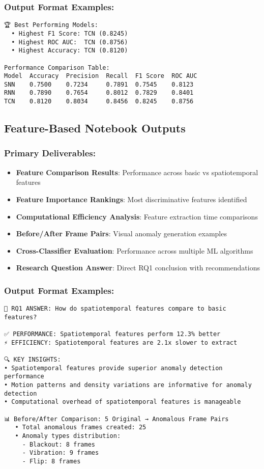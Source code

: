 \documentclass[11pt,a4paper]{article}
\begin{document}
\subsubsection{Output Format Examples:}
\begin{lstlisting}[caption=Architecture-Based Output Sample]
🏆 Best Performing Models:
  • Highest F1 Score: TCN (0.8245)
  • Highest ROC AUC:  TCN (0.8756)
  • Highest Accuracy: TCN (0.8120)

Performance Comparison Table:
Model  Accuracy  Precision  Recall  F1 Score  ROC AUC
SNN    0.7500    0.7234     0.7891  0.7545    0.8123
RNN    0.7890    0.7654     0.8012  0.7829    0.8401
TCN    0.8120    0.8034     0.8456  0.8245    0.8756
\end{lstlisting}

\subsection{Feature-Based Notebook Outputs}

\subsubsection{Primary Deliverables:}
\begin{itemize}
    \item \textbf{Feature Comparison Results}: Performance across basic vs spatiotemporal features
    \item \textbf{Feature Importance Rankings}: Most discriminative features identified
    \item \textbf{Computational Efficiency Analysis}: Feature extraction time comparisons
    \item \textbf{Before/After Frame Pairs}: Visual anomaly generation examples
    \item \textbf{Cross-Classifier Evaluation}: Performance across multiple ML algorithms
    \item \textbf{Research Question Answer}: Direct RQ1 conclusion with recommendations
\end{itemize}

\subsubsection{Output Format Examples:}
\begin{lstlisting}[caption=Feature-Based Output Sample]
🎯 RQ1 ANSWER: How do spatiotemporal features compare to basic features?

✅ PERFORMANCE: Spatiotemporal features perform 12.3% better
⚡ EFFICIENCY: Spatiotemporal features are 2.1x slower to extract

🔍 KEY INSIGHTS:
• Spatiotemporal features provide superior anomaly detection performance
• Motion patterns and density variations are informative for anomaly detection
• Computational overhead of spatiotemporal features is manageable

📊 Before/After Comparison: 5 Original → Anomalous Frame Pairs
   • Total anomalous frames created: 25
   • Anomaly types distribution:
     - Blackout: 8 frames
     - Vibration: 9 frames  
     - Flip: 8 frames
\end{lstlisting}
\end{document}
